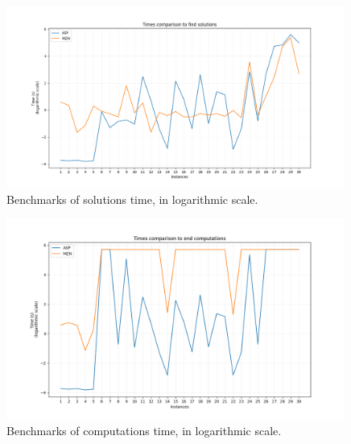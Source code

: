 \documentclass[headinclude, footinclude, abstract=on]{scrarticle}
\begin{document}
\begin{figure}[H]
	\centering
	\includegraphics[width=0.99\textwidth]{images/Figure_1.png}
    \caption{Benchmarks of solutions time, in logarithmic scale.}
    \label{fig:bench1}
\end{figure}

\begin{figure}[H]
	\centering
	\includegraphics[width=0.99\textwidth]{images/total computation.png}
    \caption{Benchmarks of computations time, in logarithmic scale.}
    \label{fig:bench2}
\end{figure}


\end{document}
